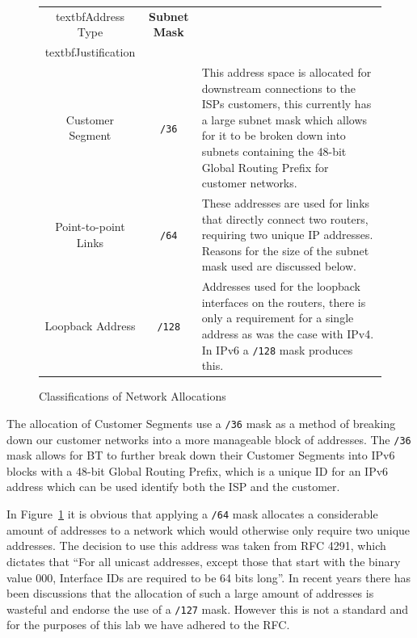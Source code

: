 \begin{figure}[!ht]     \caption{Classifications of Network Allocations}
\label{figure:network-alloc-3}     \centering
\begin{tabular}{|c|c|p{5.5cm}|}
		
        \hline textbf{Address Type} & \textbf{Subnet Mask} &
		\\textbf{Justification} \\
		
        \hline         Customer Segment & \texttt{/36} & This address space is
allocated for downstream connections to the ISPs customers, this currently has
a large subnet mask which allows for it to be broken down into subnets
containing the 48-bit Global Routing Prefix for customer networks.\\
		
        \hline         Point-to-point Links & \texttt{/64} & These addresses
are used for links that directly connect two routers, requiring two unique IP
addresses. Reasons for the size of the subnet mask used are discussed below.\\
		
        \hline         Loopback Address & \texttt{/128} & Addresses used for
the loopback interfaces on the routers, there is only a requirement for a
single address as was the case with IPv4. In IPv6 a \texttt{/128} mask produces
this.\\
		
		\hline     \end{tabular} \end{figure}

The allocation of Customer Segments use a \texttt{/36} mask as a method of
breaking down our customer networks into a more manageable block of addresses.
The \texttt{/36} mask allows for BT to further break down their Customer
Segments into IPv6 blocks with a 48-bit Global Routing Prefix, which is a
unique ID for an IPv6 address which can be used identify both the ISP and the
customer.

In Figure~\ref{figure:network-alloc-3} it is obvious that applying a
\texttt{/64} mask allocates a considerable amount of addresses to a network
which would otherwise only require two unique addresses. The decision to use
this address was taken from RFC 4291, which dictates that ``For all unicast
addresses, except those that start with the binary value 000, Interface IDs are
required to be 64 bits long''. In recent years there has been discussions that
the allocation of such a large amount of addresses is wasteful and endorse the
use of a \texttt{/127} mask. However this is not a standard and for the
purposes of this lab we have adhered to the RFC.
